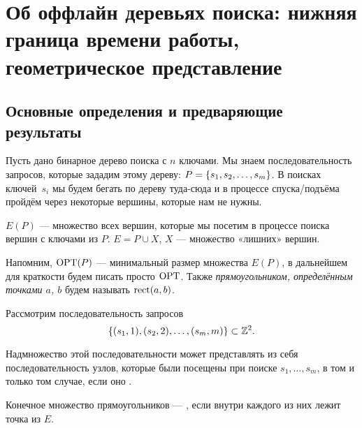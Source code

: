 \section{Об оффлайн деревьях поиска: нижняя граница времени работы, геометрическое представление} 

\subsection{Основные определения и предваряющие результаты}

Пусть дано бинарное дерево поиска с $n$ ключами. Мы знаем последовательность запросов, которые зададим этому дереву: $P = \lbrace s_1,s_2,\ldots,s_m\rbrace$. В поисках ключей~$s_i$ мы будем бегать по дереву туда-сюда и в процессе спуска/подъёма пройдём через некоторые вершины, которые нам не нужны.

\begin{definition}
	$E(P)$ — множество всех вершин, которые мы посетим в процессе поиска вершин с ключами из $P$. $E = P \cup X$, $X$ — множество «лишних» вершин.
\end{definition}

Напомним, $\operatorname{OPT} (P)$ — минимальный размер множества $E(P)$, в дальнейшем для краткости будем писать просто $\operatorname{OPT}$. Также {\it прямоугольником, определённым точками $a$, $b$} будем называть $\operatorname{rect} (a,b)$.


\begin{theorem}
	Рассмотрим последовательность запросов
	\begin{equation*}
		\lbrace(s_1,1),(s_2,2),\ldots,(s_m,m)\rbrace \subset {\mathbb Z}^2.
	\end{equation*}

	Надмножество этой последовательности может представлять из себя последовательность узлов, которые были посещены при поиске $s_1, \ldots, s_m$, в том и только том случае, если оно \arbs.
\end{theorem}

\begin{definition}
	Конечное множество прямоугольников — \arbs, если внутри каждого из них лежит точка из $E$.
\end{definition}

